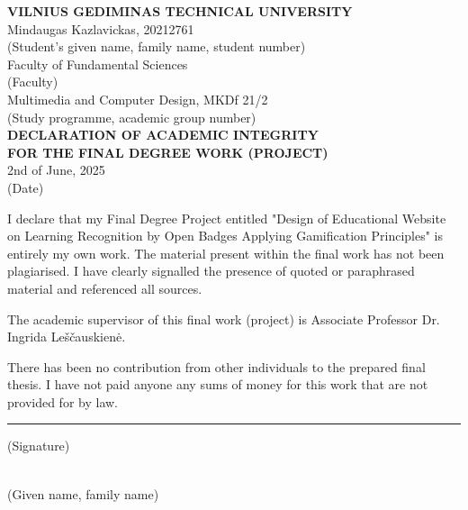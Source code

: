 \begin{center}
{\large\bfseries\scshape VILNIUS GEDIMINAS TECHNICAL UNIVERSITY}\\[1\baselineskip]
Mindaugas Kazlavickas, 20212761\\
{\footnotesize (Student's given name, family name, student number)}\\
Faculty of Fundamental Sciences\\
{\footnotesize (Faculty)}\\
Multimedia and Computer Design, MKDf 21/2\\
{\footnotesize (Study programme, academic group number)}\\[2\baselineskip]

{\large\bfseries DECLARATION OF ACADEMIC INTEGRITY}\\
{\large\bfseries FOR THE FINAL DEGREE WORK (PROJECT)}\\[1\baselineskip]

2nd of June, 2025\\
{\footnotesize (Date)}\\[1\baselineskip]
\end{center}

I declare that my Final Degree Project entitled "Design of Educational Website on Learning Recognition by Open Badges Applying Gamification Principles" is entirely my own work. 
The material present within the final work has not been plagiarised. I have clearly signalled the presence of quoted or paraphrased material and referenced all sources.

The academic supervisor of this final work (project) is Associate Professor Dr. Ingrida Leščauskienė.

There has been no contribution from other individuals to the prepared final thesis. 
I have not paid anyone any sums of money for this work that are not provided for by law.\\[2\baselineskip]
%
\begin{minipage}[t]{0.5\textwidth}
\end{minipage}
%
\hspace{\fill}
%
\begin{minipage}[t]{0.2\textwidth}
\centering\hrule\medskip\scriptsize (Signature)
\end{minipage}
%
\hspace{\fill}
%
\begin{minipage}[t]{0.3\textwidth}
\\
\medskip\scriptsize (Given name, family name)
\end{minipage}